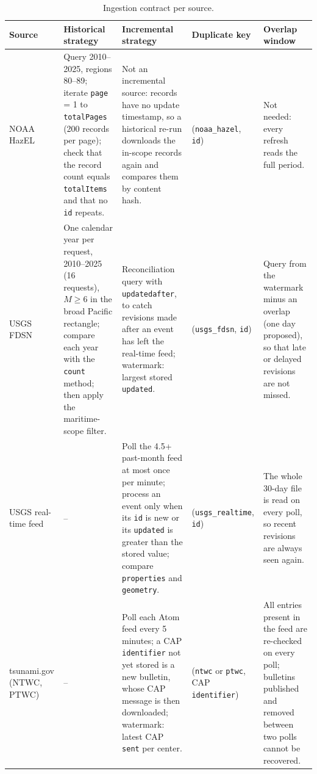 \documentclass[a4paper,11pt,oneside]{book}
\begin{document}
\begin{table}[H]
\centering
\footnotesize
\begin{tabularx}{\textwidth}{@{}>{\raggedright\arraybackslash}p{1.6cm}>{\raggedright\arraybackslash}X>{\raggedright\arraybackslash}X>{\raggedright\arraybackslash}p{2.5cm}>{\raggedright\arraybackslash}p{2.4cm}@{}}
\toprule
Source & Historical strategy & Incremental strategy & Duplicate key & Overlap window \\
\midrule
NOAA HazEL & Query 2010--2025, regions 80--89; iterate \texttt{page} = 1 to \texttt{totalPages} (200 records per page); check that the record count equals \texttt{totalItems} and that no \texttt{id} repeats. & Not an incremental source: records have no update timestamp, so a historical re-run downloads the in-scope records again and compares them by content hash. & (\texttt{noaa\_hazel}, \texttt{id}) & Not needed: every refresh reads the full period. \\
USGS FDSN & One calendar year per request, 2010--2025 (16 requests), $M \geq 6$ in the broad Pacific rectangle; compare each year with the \texttt{count} method; then apply the maritime-scope filter. & Reconciliation query with \texttt{updatedafter}, to catch revisions made after an event has left the real-time feed; watermark: largest stored \texttt{updated}. & (\texttt{usgs\_fdsn}, \texttt{id}) & Query from the watermark minus an overlap (one day proposed), so that late or delayed revisions are not missed. \\
USGS real-time feed & -- & Poll the 4.5+ past-month feed at most once per minute; process an event only when its \texttt{id} is new or its \texttt{updated} is greater than the stored value; compare \texttt{properties} and \texttt{geometry}. & (\texttt{usgs\_realtime}, \texttt{id}) & The whole 30-day file is read on every poll, so recent revisions are always seen again. \\
tsunami.gov (NTWC, PTWC) & -- & Poll each Atom feed every 5 minutes; a CAP \texttt{identifier} not yet stored is a new bulletin, whose CAP message is then downloaded; watermark: latest CAP \texttt{sent} per center. & (\texttt{ntwc} or \texttt{ptwc}, CAP \texttt{identifier}) & All entries present in the feed are re-checked on every poll; bulletins published and removed between two polls cannot be recovered. \\
\bottomrule
\end{tabularx}
\caption{Ingestion contract per source.}
\label{tab:contract}
\end{table}
\end{document}
